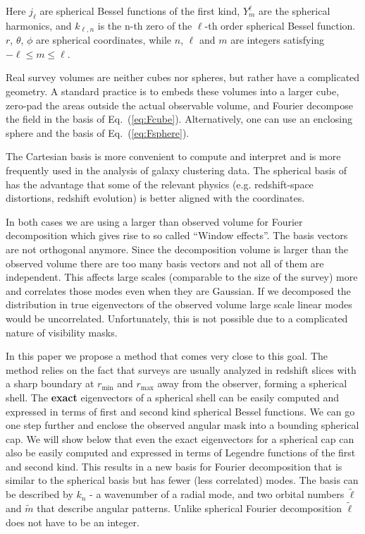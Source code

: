 \documentclass[fleqn,usenatbib]{mnras}
\begin{document}
Here $j_\ell$ are spherical Bessel functions of the first kind, $Y^\ell_m$ are the
spherical harmonics, and $k_{\ell,n}$ is the n-th zero of the $\ell$-th order
spherical Bessel function. $r$, $\theta$, $\phi$ are spherical coordinates,
while $n$, $\ell$ and $m$ are integers satisfying $-\ell \leq m \leq \ell$.

Real survey volumes are neither cubes nor spheres, but rather have a complicated
geometry. A standard practice is to embeds these volumes into a larger cube,
zero-pad the areas outside the actual observable volume, and Fourier decompose the
field in the basis of Eq.~(\ref{eq:Fcube}). Alternatively, one can use an
enclosing sphere and the basis of Eq.~(\ref{eq:Fsphere}).

The Cartesian basis is more convenient to compute and interpret and
is more frequently used in the analysis of galaxy clustering data. The spherical
basis of has the advantage that some of the relevant physics (e.g. redshift-space
distortions, redshift evolution) is better aligned with the coordinates.

In both cases we are using a larger than observed volume for Fourier
decomposition which gives rise to so called ``Window effects''. The basis vectors
are not orthogonal anymore. Since the decomposition volume is larger than the
observed volume there are too many basis vectors and not all of them are
independent. This affects large scales (comparable to the size of the survey) more
and correlates those modes even when they are Gaussian. If we decomposed the
distribution in true eigenvectors of the observed volume large scale linear modes
would be uncorrelated. Unfortunately, this is not possible due to a complicated
nature of visibility masks.

In this paper we propose a method that comes very close to this goal. The method
relies on the fact that surveys are usually analyzed in redshift slices with a
sharp boundary at $r_\mathrm{min}$ and $r_\mathrm{max}$ away from the observer,
forming a spherical shell. The \textbf{exact} eigenvectors of a spherical shell
can be easily computed and expressed in terms of first and second kind spherical
Bessel functions. We can go one step further and enclose the observed angular mask
into a bounding spherical cap. We will show below that even the exact eigenvectors
for a spherical cap can also be easily computed and expressed in terms of Legendre
functions of the first and second kind. This results in a new basis for Fourier
decomposition that is similar to the spherical basis but has fewer (less
correlated) modes. The basis can be described by $k_n$ - a wavenumber of a radial
mode, and two orbital numbers $\widetilde{\ell}$ and $\widetilde{m}$ that describe
angular patterns. Unlike spherical Fourier decomposition $ \widetilde{\ell}$ does
not have to be an integer.
\end{document}
